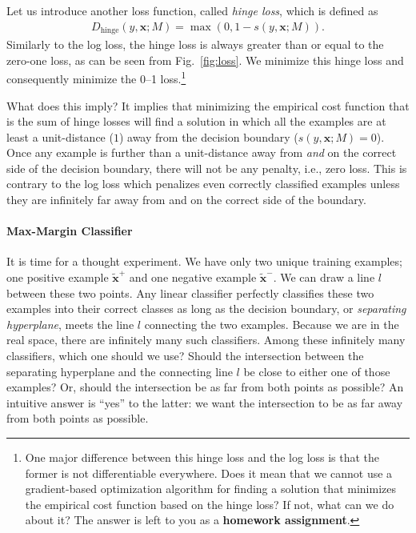 \documentclass{report}
\newcommand{\vect}[1]{\mathbf{#1}}
\newcommand{\vx}[0]{\vect{x}}
\newcommand{\hinge}{\text{hinge}}
\begin{document}
Let us introduce another loss function, called {\it hinge loss}, which is
defined as
\begin{align*}
    D_{\hinge}(y, \vx; M) = \max(0, 1 - s(y, \vx; M)).
\end{align*}
Similarly to the log loss, the hinge loss is always greater than or equal to the
zero-one loss, as can be seen from Fig.~\ref{fig:loss}. We minimize this hinge
loss and consequently minimize the 0--1 loss.\footnote{
    One major difference between this hinge loss and the log loss is that the
    former is not differentiable everywhere. Does it mean that we cannot use a
    gradient-based optimization algorithm for finding a solution that minimizes
    the empirical cost function based on the hinge loss? If not, what can we do
    about it? The answer is left to you as a {\bf homework assignment}.
}

What does this imply? It implies that minimizing the empirical cost function
that is the sum of hinge losses will find a solution in which all the examples
are at least a unit-distance ($1$) away from the decision boundary ($s(y, \vx;
M) = 0$). Once any example is further than a unit-distance away from  {\it and}
on the correct side of the decision boundary, there will not be any penalty, i.e.,
zero loss. This is contrary to the log loss which penalizes even correctly
classified examples unless they are infinitely far away from and on the correct
side of the boundary.

\paragraph{Max-Margin Classifier}

It is time for a thought experiment. We have only two unique training examples;
one positive example $\tilde{\vx}^+$ and one negative example $\tilde{\vx}^-$.
We can draw a line $l$ between these two points.  Any linear classifier
perfectly classifies these two examples into their correct classes as long as
the decision boundary, or {\it separating hyperplane}, meets the line $l$
connecting the two examples.  Because we are in the real space, there are
infinitely many such classifiers.  Among these infinitely many classifiers,
which one should we use? Should the intersection between the separating
hyperplane and the connecting line $l$ be close to either one of those examples?
Or, should the intersection be as far from both points as possible? An intuitive
answer is ``yes'' to the latter: we want the intersection to be as far away from
both points as possible. 
\end{document}

